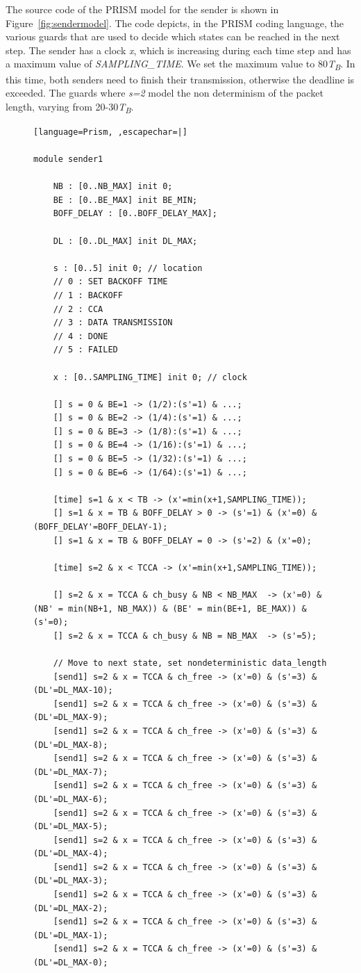 \documentclass[
a4paper,
12pt
]{scrartcl}
\begin{document}
The source code of the PRISM model for the sender is shown in Figure~\ref{fig:sendermodel}. The code depicts, in the PRISM coding language, the various guards that are used to decide which states can be reached in the next step. The sender has a clock \textit{x}, which is increasing during each time step and has a maximum value of \textit{SAMPLING\_TIME}. We set the maximum value to 80\textit{T\textsubscript{B}}. In this time, both senders need to finish their transmission, otherwise the deadline is exceeded. The guards where \textit{s=2} model the non determinism of the packet length, varying from 20-30\textit{T\textsubscript{B}}.

\begin{figure}[H]
\begin{lstlisting}[language=Prism, ,escapechar=|]

module sender1

	NB : [0..NB_MAX] init 0;
	BE : [0..BE_MAX] init BE_MIN;
	BOFF_DELAY : [0..BOFF_DELAY_MAX];

	DL : [0..DL_MAX] init DL_MAX;

	s : [0..5] init 0; // location
	// 0 : SET BACKOFF TIME
	// 1 : BACKOFF
	// 2 : CCA
	// 3 : DATA TRANSMISSION
	// 4 : DONE
	// 5 : FAILED

	x : [0..SAMPLING_TIME] init 0; // clock

	[] s = 0 & BE=1 -> (1/2):(s'=1) & ...;
	[] s = 0 & BE=2 -> (1/4):(s'=1) & ...;
	[] s = 0 & BE=3 -> (1/8):(s'=1) & ...;
	[] s = 0 & BE=4 -> (1/16):(s'=1) & ...;
	[] s = 0 & BE=5 -> (1/32):(s'=1) & ...;
	[] s = 0 & BE=6 -> (1/64):(s'=1) & ...;

	[time] s=1 & x < TB -> (x'=min(x+1,SAMPLING_TIME));
	[] s=1 & x = TB & BOFF_DELAY > 0 -> (s'=1) & (x'=0) & (BOFF_DELAY'=BOFF_DELAY-1);
	[] s=1 & x = TB & BOFF_DELAY = 0 -> (s'=2) & (x'=0);

	[time] s=2 & x < TCCA -> (x'=min(x+1,SAMPLING_TIME));
	
	[] s=2 & x = TCCA & ch_busy & NB < NB_MAX  -> (x'=0) & (NB' = min(NB+1, NB_MAX)) & (BE' = min(BE+1, BE_MAX)) & (s'=0);
	[] s=2 & x = TCCA & ch_busy & NB = NB_MAX  -> (s'=5);

	// Move to next state, set nondeterministic data_length
	[send1] s=2 & x = TCCA & ch_free -> (x'=0) & (s'=3) & (DL'=DL_MAX-10);
	[send1] s=2 & x = TCCA & ch_free -> (x'=0) & (s'=3) & (DL'=DL_MAX-9);
	[send1] s=2 & x = TCCA & ch_free -> (x'=0) & (s'=3) & (DL'=DL_MAX-8);
	[send1] s=2 & x = TCCA & ch_free -> (x'=0) & (s'=3) & (DL'=DL_MAX-7);
	[send1] s=2 & x = TCCA & ch_free -> (x'=0) & (s'=3) & (DL'=DL_MAX-6);
	[send1] s=2 & x = TCCA & ch_free -> (x'=0) & (s'=3) & (DL'=DL_MAX-5);
	[send1] s=2 & x = TCCA & ch_free -> (x'=0) & (s'=3) & (DL'=DL_MAX-4);
	[send1] s=2 & x = TCCA & ch_free -> (x'=0) & (s'=3) & (DL'=DL_MAX-3);
	[send1] s=2 & x = TCCA & ch_free -> (x'=0) & (s'=3) & (DL'=DL_MAX-2);
	[send1] s=2 & x = TCCA & ch_free -> (x'=0) & (s'=3) & (DL'=DL_MAX-1);
	[send1] s=2 & x = TCCA & ch_free -> (x'=0) & (s'=3) & (DL'=DL_MAX-0);


\end{lstlisting}
\end{figure}
\end{document}
